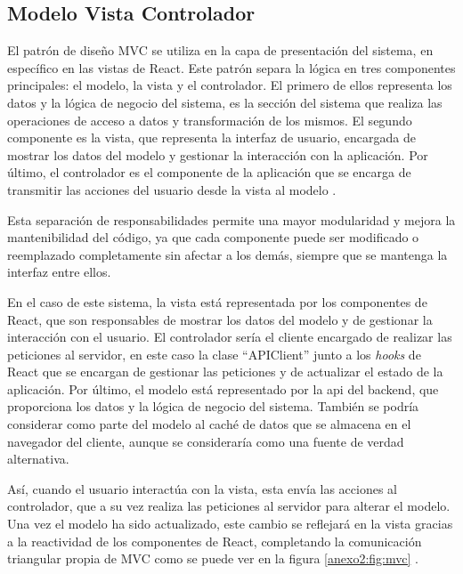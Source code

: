 \subsection{Modelo Vista Controlador}
\label{anexo2:sec:mvc}
El patrón de diseño MVC se utiliza en la capa de presentación del sistema, en
específico en las vistas de React. Este patrón separa la lógica en tres
componentes principales: el modelo, la vista y el controlador.  El primero de
ellos representa los datos y la lógica de negocio del sistema, es la sección del
sistema que realiza las operaciones de acceso a datos y transformación de los
mismos. El segundo componente es la vista, que representa la interfaz de
usuario, encargada de mostrar los datos del modelo y gestionar la interacción
con la aplicación.  Por último, el controlador es el componente de la aplicación
que se encarga de transmitir las acciones del usuario desde la vista al modelo
\parencite{NorfolkDevelopers2015Dec}.

Esta separación de responsabilidades permite una mayor modularidad y mejora la
mantenibilidad del código, ya que cada componente puede ser modificado o
reemplazado completamente sin afectar a los demás, siempre que se mantenga la
interfaz entre ellos.

En el caso de este sistema, la vista está representada por los componentes de
React, que son responsables de mostrar los datos del modelo y de gestionar la
interacción con el usuario. El controlador sería el cliente encargado de
realizar las peticiones al servidor, en este caso la clase \enquote{APIClient}
junto a los \textit{hooks} de React que se encargan de gestionar las peticiones
y de actualizar el estado de la aplicación\footnotemark. Por último, el modelo
está representado por la \gls{api} del \gls{backend}, que proporciona los datos
y la lógica de negocio del sistema. También se podría considerar como parte del
modelo al caché de datos que se almacena en el navegador del cliente, aunque se
consideraría como una fuente de verdad alternativa.

Así, cuando el usuario interactúa con la vista, esta envía las acciones al
controlador, que a su vez realiza las peticiones al servidor para alterar el
modelo. Una vez el modelo ha sido actualizado, este cambio se reflejará en la
vista gracias a la reactividad de los componentes de React, completando la
comunicación triangular propia de MVC como se puede ver en la figura
\ref{anexo2:fig:mvc} \parencite{PatternOrientedSoftwareArchitecture}.


